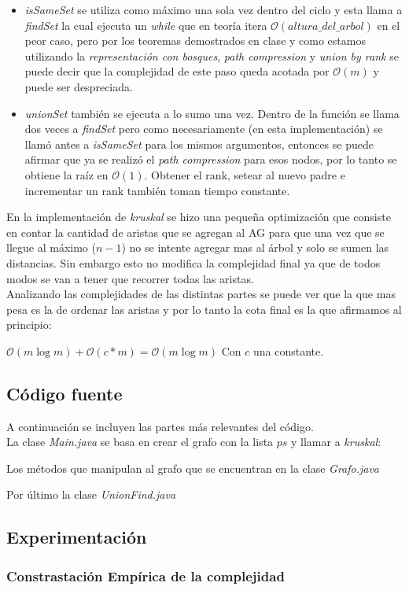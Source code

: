 \begin{itemize}
	\item \textit{isSameSet} se utiliza como máximo una sola vez dentro del ciclo y esta llama a \textit{findSet} la cual ejecuta un \emph{while} que en teoría itera $\mathcal{O}(altura\_del\_arbol)$ en el peor caso, pero por los teoremas demostrados en clase y como estamos utilizando la \emph{representación con bosques}, \emph{path compression} y \emph{union by rank} se puede decir que la complejidad de este paso queda acotada por $\mathcal{O}(m)$ y puede ser despreciada.
	\item \textit{unionSet} también se ejecuta a lo sumo una vez. Dentro de la función se llama dos veces a \textit{findSet} pero como necesariamente (en esta implementación) se llamó antes a \textit{isSameSet} para los mismos argumentos, entonces se puede afirmar que ya se realizó el \emph{path compression} para esos nodos, por lo tanto se obtiene la raíz en $\mathcal{O}(1)$. Obtener el rank, setear al nuevo padre e incrementar un rank también toman tiempo constante.  
\end{itemize}

En la implementación de \textit{kruskal} se hizo una pequeña optimización que consiste en contar la cantidad de aristas que se agregan al AG para que una vez que se llegue al máximo ($n-1$) no se intente agregar mas al árbol y solo se sumen las distancias. Sin embargo esto no modifica la complejidad final ya que de todos modos se van a tener que recorrer todas las aristas.\\

Analizando las complejidades de las distintas partes se puede ver que la que mas pesa es la de ordenar las aristas y por lo tanto la cota final es la que afirmamos al principio:

\begin{center}
	$\mathcal{O}(m\log{}m) + \mathcal{O}(c*m) = \mathcal{O}(m\log{}m)$ Con $c$ una constante.
\end{center}

\subsection{Código fuente}

A continuación se incluyen las partes más relevantes del código.\\
La clase \emph{Main.java} se basa en crear el grafo con la lista $ps$ y llamar a \textit{kruskal}:

Los métodos que manipulan al grafo que se encuentran en la clase \emph{Grafo.java}

\newpage
Por último la clase \emph{UnionFind.java}


\newpage

\subsection{Experimentación}

\subsubsection{Constrastación Empírica de la complejidad}
